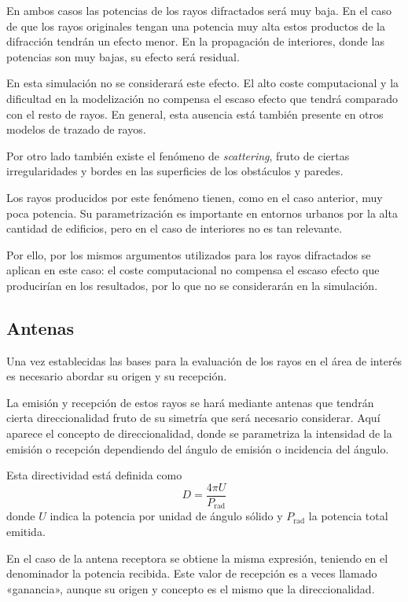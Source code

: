 En ambos casos las potencias de los rayos difractados será muy baja.
En el caso de que los rayos originales tengan una potencia muy alta estos productos de la difracción tendrán un efecto menor.
En la propagación de interiores, donde las potencias son muy bajas, su efecto será residual.\cite{5G_Simulation}

En esta simulación no se considerará este efecto.
El alto coste computacional y la dificultad en la modelización no compensa el escaso efecto que tendrá comparado con el resto de rayos.
En general, esta ausencia está también presente en otros modelos de trazado de rayos.

Por otro lado también existe el fenómeno de \textit{scattering}, fruto de ciertas irregularidades y bordes en las superficies de los obstáculos y paredes.\cite{Compilation}

Los rayos producidos por este fenómeno tienen, como en el caso anterior, muy poca potencia.
Su parametrización es importante en entornos urbanos por la alta cantidad de edificios, pero en el caso de interiores no es tan relevante.

Por ello, por los mismos argumentos utilizados para los rayos difractados se aplican en este caso: el coste computacional no compensa el escaso efecto que producirían en los resultados, por lo que no se considerarán en la simulación.

\subsection{Antenas}
\label{sec:antenas}

Una vez establecidas las bases para la evaluación de los rayos en el área de interés es necesario abordar su origen y su recepción.

La emisión y recepción de estos rayos se hará mediante antenas que tendrán cierta direccionalidad fruto de su simetría que será necesario considerar.
Aquí aparece el concepto de direccionalidad, donde se parametriza la intensidad de la emisión o recepción dependiendo del ángulo de emisión o incidencia del ángulo.\cite{Antennas}

Esta directividad está definida como
\begin{equation}
    D = \frac{4\pi U}{P_\text{rad}}
\end{equation}
donde $U$ indica la potencia por unidad de ángulo sólido y $P_\text{rad}$ la potencia total emitida.

En el caso de la antena receptora se obtiene la misma expresión, teniendo en el denominador la potencia recibida.
Este valor de recepción es a veces llamado «ganancia», aunque su origen y concepto es el mismo que la direccionalidad.

